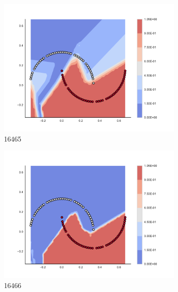 \begin{figure}[h]
\begin{subfigure}[b]{0.09\textwidth}
    \includegraphics[clip, trim=2.35cm 1.75cm 4.5cm 0cm,width=\textwidth]{img/convergence/16465.pdf}
    \caption{16465}
    \label{fig:convergence_16465}
\end{subfigure}
%
\begin{subfigure}[b]{0.09\textwidth}
    \includegraphics[clip, trim=2.35cm 1.75cm 4.5cm 0cm,width=\textwidth]{img/convergence/16466.pdf}
    \caption{16466}
    \label{fig:convergence_16466}
\end{subfigure}
%
\begin{subfigure}[b]{0.09\textwidth}

\end{subfigure}
\end{figure}
